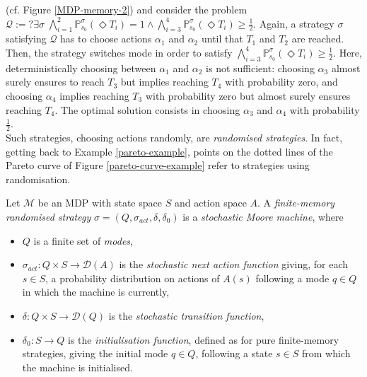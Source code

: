 (cf. Figure \ref{MDP-memory-2}) and consider the \MOSR{} problem
$\mathcal{Q}:= ?\exists \sigma \; \bigwedge_{i=1}^2 \mathbb{P}^\sigma_{s_0}(\Diamond T_i) = 1 \wedge \bigwedge_{i=3}^4 \mathbb{P}^\sigma_{s_0} (\Diamond T_i) \geq \frac{1}{2}$.
Again, a strategy $\sigma$ satisfying $\mathcal{Q}$ has to
choose actions $\alpha_1$ and $\alpha_2$ until that $T_1$ and $T_2$ are reached.
Then, the strategy switches mode in order to satisfy $\bigwedge_{i=3}^4 \mathbb{P}^\sigma_{s_0} (\Diamond T_i) \geq \frac{1}{2}$. Here, deterministically choosing between $\alpha_1$ and $\alpha_2$ is not sufficient: choosing $\alpha_3$ almost surely ensures to reach $T_3$ but implies reaching $T_4$ with probability zero,
and choosing $\alpha_4$ implies reaching $T_3$ with probability zero but almost surely ensures reaching $T_4$.
The optimal solution consists in choosing $\alpha_3$ and $\alpha_4$ with probability $\frac{1}{2}$.\\

Such strategies, choosing actions randomly, are \textit{randomised strategies}.
In fact, getting back to Example \ref{pareto-example}, points on the dotted lines of the Pareto curve of Figure \ref{pareto-curve-example} refer to strategies using randomisation.

\begin{definition}
  Let \sloppy $\mathcal{M}$ be an MDP with state space $S$ and action space $A$. A \textit{finite-memory randomised strategy} $\sigma = (Q, \sigma_{act}, \delta, \delta_0)$ is a \textit{stochastic Moore machine}, where
  \begin{itemize}
    \item $Q$ is a finite set of \textit{modes},
    \item $\sigma_{act}: Q \times S \rightarrow \mathcal{D}(A)$ is the \textit{stochastic next action function} giving, for each $s \in S$, a probability distribution on actions of $A(s)$ following a mode $q \in Q$ in which the machine is currently,
    \item $\delta: Q \times S \rightarrow \mathcal{D}(Q)$ is the \textit{stochastic transition function},
    \item $\delta_0: S \rightarrow Q$ is the \textit{initialisation function}, defined as for pure finite-memory strategies, giving the initial mode $q \in Q$, following a state $s \in S$ from which the machine is initialised.
  \end{itemize}
\end{definition}

